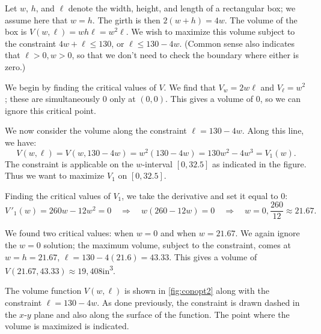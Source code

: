 {Let $w$, $h$, and $\ell$ denote the width, height, and length of a rectangular box; we assume here that $w=h$. The girth is then $2(w+h) = 4w$. The volume of the box is $V(w,\ell) = wh\ell = w^2\ell$. We wish to maximize this volume subject to the constraint $4w+\ell\leq 130$, or $\ell\leq 130-4w$. (Common sense also indicates that $\ell>0, w>0$, so that we don't need to check the boundary where either is zero.)

We begin by finding the critical values of $V$. We find that $V_w = 2w\ell$ and $V_\ell = w^2$; these are simultaneously 0 only at $(0,0)$. This gives a volume of 0, so we can ignore this critical point. 

We now consider the volume along the constraint $\ell=130-4w.$ Along this line, we have:
\[V(w,\ell) = V(w,130-4w) = w^2(130-4w) = 130w^2-4w^3 = V_1(w).\]
The constraint is applicable on the $w$-interval $[0,32.5]$ as indicated in the figure. Thus we want to maximize $V_1$ on $[0,32.5]$. 

Finding the critical values of $V_1$, we take the derivative and set it equal to 0:
\[V\,'_1(w) = 260w-12w^2 = 0 \quad \Rightarrow \quad w(260-12w)= 0 \quad \Rightarrow \quad w=0,\frac{260}{12}\approx 21.67.\]

We found two critical values: when $w=0$ and when $w=21.67$. We again ignore the $w=0$ solution; the maximum volume, subject to the constraint, comes at $w=h=21.67$, $\ell = 130-4(21.6) =43.33.$ This gives a volume of $V(21.67,43.33) \approx 19{,}408$in\textsuperscript3. 


The volume function $V(w,\ell)$ is shown in \autoref{fig:conopt2} along with the constraint $\ell = 130-4w$. As done previously, the constraint is drawn dashed in the $x$-$y$ plane and also along the surface of the function. The point where the volume is maximized is indicated.}

